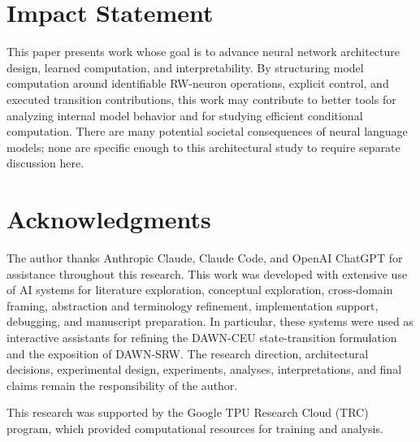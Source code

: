 \documentclass{article}
\begin{document}
\section*{Impact Statement}

This paper presents work whose goal is to advance neural network architecture design, learned computation, and interpretability. By structuring model computation around identifiable RW-neuron operations, explicit control, and executed transition contributions, this work may contribute to better tools for analyzing internal model behavior and for studying efficient conditional computation. There are many potential societal consequences of neural language models; none are specific enough to this architectural study to require separate discussion here.

\section*{Acknowledgments}

The author thanks Anthropic Claude, Claude Code, and OpenAI ChatGPT for assistance throughout this research. This work was developed with extensive use of AI systems for literature exploration, conceptual exploration, cross-domain framing, abstraction and terminology refinement, implementation support, debugging, and manuscript preparation. In particular, these systems were used as interactive assistants for refining the DAWN-CEU state-transition formulation and the exposition of DAWN-SRW. The research direction, architectural decisions, experimental design, experiments, analyses, interpretations, and final claims remain the responsibility of the author.

This research was supported by the Google TPU Research Cloud (TRC) program, which provided computational resources for training and analysis.


\clearpage



\clearpage
\onecolumn
\appendix
\raggedbottom
\setlength{\textfloatsep}{8pt plus 2pt minus 2pt}
\setlength{\floatsep}{6pt plus 2pt minus 2pt}
\setlength{\intextsep}{8pt plus 2pt minus 2pt}
\setlength{\abovecaptionskip}{4pt}
\setlength{\belowcaptionskip}{2pt}
\end{document}
